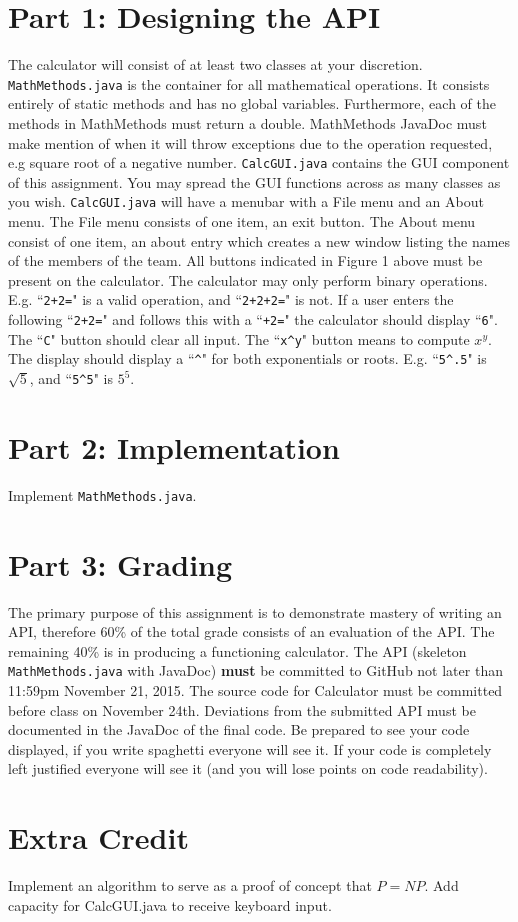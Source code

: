 \documentclass[]{simple}
\begin{document}
\section{Part 1: Designing the API}
The calculator will consist of at least two classes at your discretion.
\verb|MathMethods.java| is the container for all mathematical operations.
It consists entirely of static methods and has no global variables.
Furthermore, each of the methods in MathMethods must return a double.
MathMethods JavaDoc must make mention of when it will throw exceptions due to the operation requested, e.g square root of a negative number.
\verb|CalcGUI.java| contains the GUI component of this assignment.
You may spread the GUI functions across as many classes as you wish.
\verb|CalcGUI.java| will have a menubar with a File menu and an About menu.
The File menu consists of one item, an exit button.
The About menu consist of one item, an about entry which creates a new window listing the names of the members of the team.
All buttons indicated in Figure 1 above must be present on the calculator.
The calculator may only perform binary operations. 
E.g. ``\verb|2+2=|" is a valid operation, and ``\verb|2+2+2=|" is not. 
If a user enters the following ``\verb|2+2=|" and follows this with a ``\verb|+2=|" the calculator should display ``\verb|6|".
The ``\verb|C|" button should clear all input.
The ``\verb|x^y|" button means to compute $x^y$.
The display should display a ``\verb|^|" for both exponentials or roots.
E.g. ``\verb|5^.5|" is $\sqrt{5}$, and ``\verb|5^5|" is $5^{5}$.

\section{Part 2: Implementation}
Implement \verb|MathMethods.java|.

\section {Part 3: Grading}
The primary purpose of this assignment is to demonstrate mastery of writing an API, therefore 60\% of the total grade consists of an evaluation of the API.
The remaining 40\% is in producing a functioning calculator.
The API (skeleton \verb|MathMethods.java| with JavaDoc) \textbf{must} be committed to GitHub not later than 11:59pm November 21, 2015.
The source code for Calculator must be committed before class on November 24th.
Deviations from the submitted API must be documented in the JavaDoc of the final code.
Be prepared to see your code displayed, if you write spaghetti everyone will see it.
If your code is completely left justified everyone will see it (and you will lose points on code readability).

\section{Extra Credit}
Implement an algorithm to serve as a proof of concept that $P=NP$.
Add capacity for CalcGUI.java to receive keyboard input.
\end{document}
